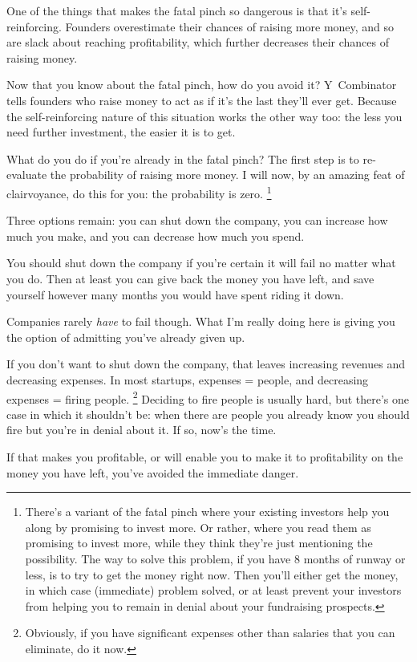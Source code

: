 One of the things that makes the fatal pinch so dangerous is that it's
self-reinforcing. Founders overestimate their chances of raising more
money, and so are slack about reaching profitability, which further
decreases their chances of raising money.

Now that you know about the fatal pinch, how do you avoid it?
Y~Combinator tells founders who raise money to act as if it's the last
they'll ever get. Because the self-reinforcing nature of this situation
works the other way too: the less you need further investment, the
easier it is to get.

What do you do if you're already in the fatal pinch? The first step is
to re-evaluate the probability of raising more money. I will now, by an
amazing feat of clairvoyance, do this for you: the probability is zero.
\footnote{There's a variant of the fatal pinch where your existing
investors help you along by promising to invest more. Or rather, where
you read them as promising to invest more, while they think they're just
mentioning the possibility. The way to solve this problem, if you have 8
months of runway or less, is to try to get the money right now. Then
you'll either get the money, in which case (immediate) problem solved,
or at least prevent your investors from helping you to remain in denial
about your fundraising prospects.}

Three options remain: you can shut down the company, you can increase
how much you make, and you can decrease how much you spend.

You should shut down the company if you're certain it will fail no
matter what you do. Then at least you can give back the money you have
left, and save yourself however many months you would have spent riding
it down.

Companies rarely \emph{have} to fail though. What I'm really doing here
is giving you the option of admitting you've already given up.

If you don't want to shut down the company, that leaves increasing
revenues and decreasing expenses. In most startups, expenses = people,
and decreasing expenses = firing people. \footnote{Obviously, if you have significant expenses other than salaries
that you can eliminate, do it now.}
Deciding to fire people is usually hard, but there's one case in which
it shouldn't be: when there are people you already know you should fire
but you're in denial about it. If so, now's the time.

If that makes you profitable, or will enable you to make it to
profitability on the money you have left, you've avoided the immediate
danger.

